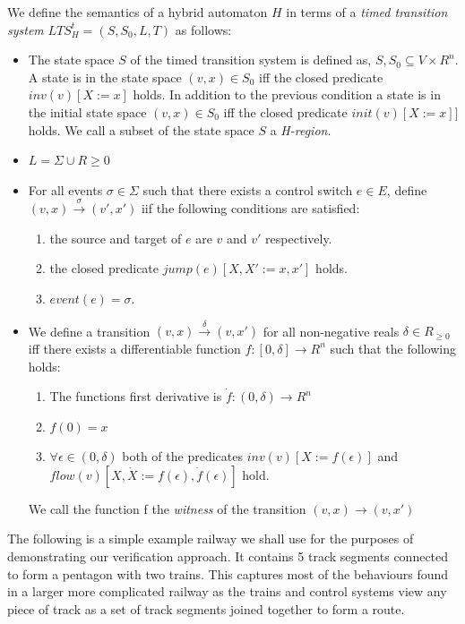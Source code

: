 \medskip
\begin{mydef}
We define the semantics of a hybrid automaton $H$ in terms of a \emph{timed transition system} $LTS^t_H = (S,S_0,L,T)$ as follows:


\begin{itemize}
 
\item The state space $S$ of the timed transition system is defined as, $S, S_0 \subseteq V \times R^n$. A state is in the state space $(v,x) \in S_0$ iff the closed predicate $inv(v)[X := x]$ holds. In addition to the previous condition a state is in the initial state space $(v,x) \in S_0$ iff the closed predicate $init(v)[X := x]]$ holds. We call a subset of the state space $S$ a \emph{H-region}.


\item $L = \Sigma \cup R {\geq 0}$

\item For all events $\sigma \in \Sigma$ such that there exists a control switch $e \in E$, define $(v,x) \xrightarrow{\sigma} (v',x')$ iif the following conditions are satisfied:
\begin{enumerate}
\item the source and target of $e$ are $v$ and $v'$ respectively. 
\item the closed predicate $jump(e)[X, X' := x,x']$ holds.
\item $event(e) = \sigma$.
\end{enumerate}

\item We define a transition $(v,x) \xrightarrow{\delta} (v,x')$ for all non-negative reals $\delta \in R_{\geq 0}$ iff there exists a differentiable function $f: [0, \delta] \to R^n$ such that the following holds:
\begin{enumerate}
\item The functions first derivative is $\dot{f} :(0,\delta) \to R^n$
\item $f(0) = x$
\item $\forall \epsilon \in (0,\delta)$ both of the predicates $inv(v)[X := f(\epsilon)]$ and $flow(v)[X,\dot{X} := f(\epsilon),\dot{f}(\epsilon)]$ hold.
\end{enumerate}
We call the function f the \emph{witness} of the transition $(v,x) \to (v, x')$

\end{itemize}


\end{mydef}
\medskip
The following is a simple example railway we shall use for the purposes of demonstrating our verification approach.  It contains 5 track segments connected to form a pentagon with two trains. This captures most of the behaviours found in a larger more complicated railway as the trains and control systems view any piece of track as a set of track segments joined together to form a route.

